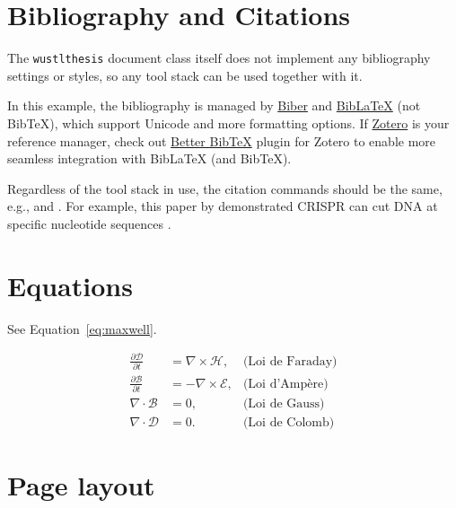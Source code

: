 \section{Bibliography and Citations}
The \texttt{wustlthesis} document class itself does not implement any bibliography settings or styles, so any tool stack can be used together with it.

In this example, the bibliography is managed by \href{http://biblatex-biber.sourceforge.net/}{Biber} and \href{https://www.ctan.org/pkg/biblatex}{BibLaTeX} (not BibTeX), which support Unicode and more formatting options.
If \href{https://www.zotero.org/}{Zotero} is your reference manager, check out \href{https://retorque.re/zotero-better-bibtex/}{Better BibTeX} plugin for Zotero to enable more seamless integration with BibLaTeX (and BibTeX).

Regardless of the tool stack in use, the citation commands should be the same, e.g., \cmd{\cite} and \cmd{\citeauthor}.
For example, this paper by \citeauthor{Jinek2012} demonstrated CRISPR can cut DNA at specific nucleotide sequences \cite{Jinek2012}.


\section{Equations}
See Equation~\ref{eq:maxwell}.

\begin{equation}
    \label{eq:maxwell}
    \begin{aligned}
    \frac{\partial\mathcal{D}}{\partial t} & = \nabla\times\mathcal{H},   & \text{(Loi de Faraday)}\\
    \frac{\partial\mathcal{B}}{\partial t} & = -\nabla\times\mathcal{E},  & \text{(Loi d'Ampère)}\\
    \nabla\cdot\mathcal{B}                 & = 0,                         & \text{(Loi de Gauss)}\\
    \nabla\cdot\mathcal{D}                 & = 0.                         & \text{(Loi de Colomb)}
    \end{aligned}
\end{equation}

\clearpage
\section{Page layout}
\layout
